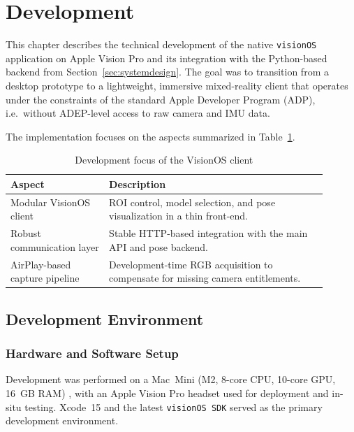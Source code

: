 \section{Development}
\label{sec:development}

This chapter describes the technical development of the native \texttt{visionOS} application on Apple Vision Pro and its integration with the Python-based backend from Section~\ref{sec:systemdesign}. The goal was to transition from a desktop prototype to a lightweight, immersive mixed-reality client that operates under the constraints of the standard Apple Developer Program (ADP), i.e.\ without ADEP-level access to raw camera and IMU data.

The implementation focuses on the aspects summarized in Table~\ref{tab:dev-focus}.

\begin{table}[H]
    \centering
    \caption{Development focus of the VisionOS client}
    \label{tab:dev-focus}
    \begin{tabular}{p{0.28\linewidth}p{0.62\linewidth}}
        \toprule
        \textbf{Aspect} & \textbf{Description} \\
        \midrule
        Modular VisionOS client &
        ROI control, model selection, and pose visualization in a thin front-end. \\
        Robust communication layer &
        Stable HTTP-based integration with the main API and pose backend. \\
        AirPlay-based capture pipeline &
        Development-time RGB acquisition to compensate for missing camera entitlements. \\
        \bottomrule
    \end{tabular}
\end{table}

\subsection{Development Environment}

\subsubsection{Hardware and Software Setup}

Development was performed on a Mac~Mini (M2, 8-core CPU, 10-core GPU, 16~GB RAM) \cite{apple_macmini_specs}, with an Apple Vision Pro headset used for deployment and in-situ testing. Xcode~15 and the latest \texttt{visionOS SDK} served as the primary development environment.  

